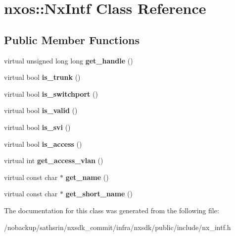 \hypertarget{classnxos_1_1NxIntf}{\section{nxos\-:\-:Nx\-Intf Class Reference}
\label{classnxos_1_1NxIntf}
}
\subsection*{Public Member Functions}
\begin{DoxyCompactItemize}
\item 
\hypertarget{classnxos_1_1NxIntf_a9408b782b54c8f8f0cd9cc9c78bacb03}{virtual unsigned long long {\bfseries get\-\_\-handle} ()}\label{classnxos_1_1NxIntf_a9408b782b54c8f8f0cd9cc9c78bacb03}

\item 
\hypertarget{classnxos_1_1NxIntf_a8d778516d7503a92cba2b99054e94e92}{virtual bool {\bfseries is\-\_\-trunk} ()}\label{classnxos_1_1NxIntf_a8d778516d7503a92cba2b99054e94e92}

\item 
\hypertarget{classnxos_1_1NxIntf_a4b628d62fc6751693a84b0ac6cc2a039}{virtual bool {\bfseries is\-\_\-switchport} ()}\label{classnxos_1_1NxIntf_a4b628d62fc6751693a84b0ac6cc2a039}

\item 
\hypertarget{classnxos_1_1NxIntf_af74e8f484db9aa3390b3c1ba81cbb810}{virtual bool {\bfseries is\-\_\-valid} ()}\label{classnxos_1_1NxIntf_af74e8f484db9aa3390b3c1ba81cbb810}

\item 
\hypertarget{classnxos_1_1NxIntf_a0044cc3ccb51fee18daa872d4a24149a}{virtual bool {\bfseries is\-\_\-svi} ()}\label{classnxos_1_1NxIntf_a0044cc3ccb51fee18daa872d4a24149a}

\item 
\hypertarget{classnxos_1_1NxIntf_a04db000fcd2df7d19a5da2da6fd3bccb}{virtual bool {\bfseries is\-\_\-access} ()}\label{classnxos_1_1NxIntf_a04db000fcd2df7d19a5da2da6fd3bccb}

\item 
\hypertarget{classnxos_1_1NxIntf_a3d2930959351e7697395566e9d58e2a5}{virtual int {\bfseries get\-\_\-access\-\_\-vlan} ()}\label{classnxos_1_1NxIntf_a3d2930959351e7697395566e9d58e2a5}

\item 
\hypertarget{classnxos_1_1NxIntf_abeffac1612ed5960a30319e15bf70122}{virtual const char $\ast$ {\bfseries get\-\_\-name} ()}\label{classnxos_1_1NxIntf_abeffac1612ed5960a30319e15bf70122}

\item 
\hypertarget{classnxos_1_1NxIntf_a16d2db39b914b9f10c4570dd468fefa8}{virtual const char $\ast$ {\bfseries get\-\_\-short\-\_\-name} ()}\label{classnxos_1_1NxIntf_a16d2db39b914b9f10c4570dd468fefa8}

\end{DoxyCompactItemize}


The documentation for this class was generated from the following file\-:\begin{DoxyCompactItemize}
\item 
/nobackup/sathsrin/nxsdk\-\_\-commit/infra/nxsdk/public/include/nx\-\_\-intf.\-h\end{DoxyCompactItemize}
